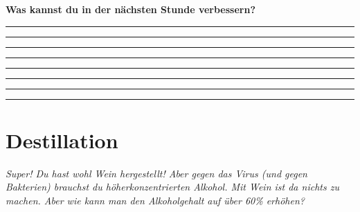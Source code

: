 \documentclass{scrartcl}  %
\begin{document}
\begin{center}
\begin{tcolorbox}
\begin{center}
\begin{tikzpicture}[scale=1]
							\end{tikzpicture}
						\end{center}
						\textbf{{\Large Was kannst du in der nächsten Stunde verbessern?}}
						\begin{center}
							\noindent\rule{12cm}{0.2pt}
							\vspace{1.1cm}
							\noindent\rule{12cm}{0.1pt}
							\vspace{1.1cm}
							\noindent\rule{12cm}{0.1pt}
							\vspace{1.1cm}
							\noindent\rule{12cm}{0.1pt}
							\vspace{1.1cm}
							\noindent\rule{12cm}{0.1pt}
							\vspace{1.1cm}
							\noindent\rule{12cm}{0.1pt}
							\vspace{1.1cm}
							\noindent\rule{12cm}{0.1pt}
							\vspace{1.1cm}
							\noindent\rule{12cm}{0.1pt}
						\end{center}
					\end{tcolorbox}
				\end{center}
								

				
\newpage

		\section{Destillation}

			\textit{Super! Du hast wohl Wein hergestellt! Aber gegen das Virus (und gegen Bakterien) brauchst du höherkonzentrierten Alkohol. Mit Wein ist da nichts zu machen. Aber wie kann man den Alkoholgehalt auf über 60\% erhöhen?} \newline
			
\end{document}
